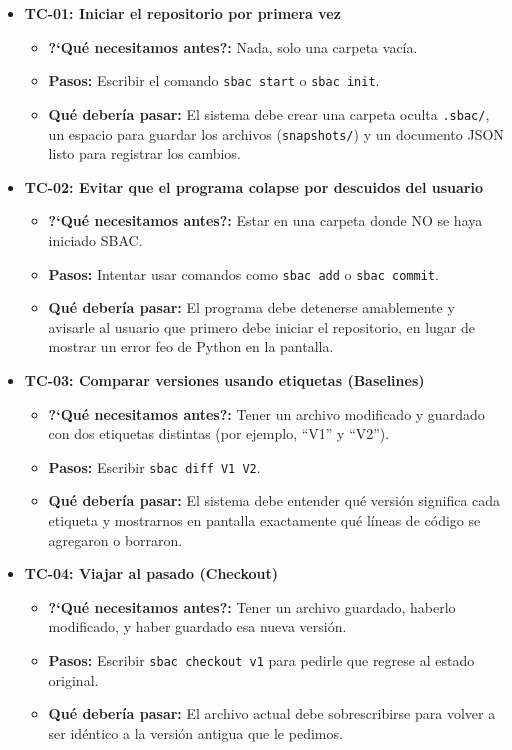 \documentclass[12pt, letterpaper]{article}
\begin{document}
\begin{itemize}[leftmargin=*]
    \item \textbf{TC-01: Iniciar el repositorio por primera vez}
    \begin{itemize}
        \item \textbf{?`Qué necesitamos antes?:} Nada, solo una carpeta vacía.
        \item \textbf{Pasos:} Escribir el comando \texttt{sbac start} o \texttt{sbac init}.
        \item \textbf{Qué debería pasar:} El sistema debe crear una carpeta oculta \texttt{.sbac/}, un espacio para guardar los archivos (\texttt{snapshots/}) y un documento JSON listo para registrar los cambios.
    \end{itemize}
    
    \item \textbf{TC-02: Evitar que el programa colapse por descuidos del usuario}
    \begin{itemize}
        \item \textbf{?`Qué necesitamos antes?:} Estar en una carpeta donde NO se haya iniciado SBAC.
        \item \textbf{Pasos:} Intentar usar comandos como \texttt{sbac add} o \texttt{sbac commit}.
        \item \textbf{Qué debería pasar:} El programa debe detenerse amablemente y avisarle al usuario que primero debe iniciar el repositorio, en lugar de mostrar un error feo de Python en la pantalla.
    \end{itemize}
    
    \item \textbf{TC-03: Comparar versiones usando etiquetas (Baselines)}
    \begin{itemize}
        \item \textbf{?`Qué necesitamos antes?:} Tener un archivo modificado y guardado con dos etiquetas distintas (por ejemplo, ``V1'' y ``V2'').
        \item \textbf{Pasos:} Escribir \texttt{sbac diff V1 V2}.
        \item \textbf{Qué debería pasar:} El sistema debe entender qué versión significa cada etiqueta y mostrarnos en pantalla exactamente qué líneas de código se agregaron o borraron.
    \end{itemize}
    
    \item \textbf{TC-04: Viajar al pasado (Checkout)}
    \begin{itemize}
        \item \textbf{?`Qué necesitamos antes?:} Tener un archivo guardado, haberlo modificado, y haber guardado esa nueva versión.
        \item \textbf{Pasos:} Escribir \texttt{sbac checkout v1} para pedirle que regrese al estado original.
        \item \textbf{Qué debería pasar:} El archivo actual debe sobrescribirse para volver a ser idéntico a la versión antigua que le pedimos.
    \end{itemize}
\end{itemize}
\end{document}
